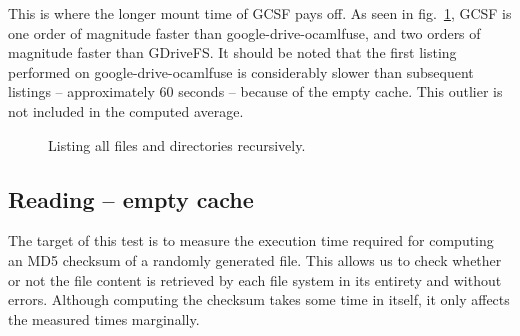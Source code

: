 This is where the longer mount time of GCSF pays off. As seen in fig.~\ref{fig:tree_benchmark}, GCSF is one order of magnitude faster than google-drive-ocamlfuse, and two orders of magnitude faster than GDriveFS. It should be noted that the first listing performed on google-drive-ocamlfuse is considerably slower than subsequent listings -- approximately 60 seconds -- because of the empty cache. This outlier is not included in the computed average.


\begin{figure}[bpt]
\centering
{}
\caption{Listing all files and directories recursively.}
\label{fig:tree_benchmark}
\end{figure}


\subsection{Reading -- empty cache} \label{reading_empty_cache}

The target of this test is to measure the execution time required for computing an MD5 checksum of a randomly generated file. This allows us to check whether or not the file content is retrieved by each file system in its entirety and without errors. Although computing the checksum takes some time in itself, it only affects the measured times marginally.


